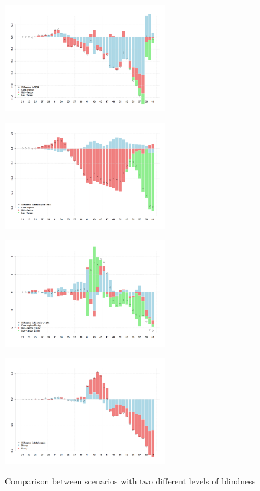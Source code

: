 \documentclass[authoryear]{article}
\begin{document}
\begin{figure}[h!]
\begin{minipage}[b]{.5\linewidth}
\centering\large 
  \includegraphics[width=7cm]{Figures/PhiGDP.png}
  \label{Fig:PhiGDP}
\end{minipage}%
  \quad \quad 
\begin{minipage}[b]{.5\linewidth}
\centering\large 
   \includegraphics[width=7cm]{Figures/PhiCapStock.png}
    \label{Fig:PhiCapStock}
\end{minipage}
\vspace{0.2cm}
    \begin{minipage}[b]{.5\linewidth}
\centering\large 
    \includegraphics[width=7cm]{Figures/PhiMarketCap.png}
    \label{Fig:PhiMarketCap}
\end{minipage}
  \quad \quad 
    \begin{minipage}[b]{.5\linewidth}
\centering\large 
    \includegraphics[width=7cm]{Figures/PhiWealth.png}
    \label{Fig:PhiWealth}
\end{minipage}
\vspace{0.2cm}
\caption{Comparison between scenarios with two different levels of blindness}\label{Fig:scen2}
\end{figure}
\end{document}
